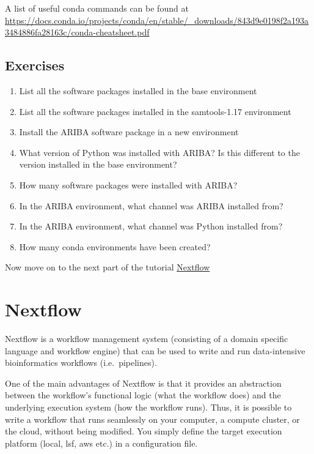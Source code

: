 \documentclass[11pt]{article}
\providecommand{\tightlist}{%
      \setlength{\itemsep}{0pt}\setlength{\parskip}{0pt}}
\begin{document}
A list of useful conda commands can be found at
\url{https://docs.conda.io/projects/conda/en/stable/_downloads/843d9e0198f2a193a3484886fa28163c/conda-cheatsheet.pdf}

    \hypertarget{exercises}{%
\subsection{Exercises}\label{exercises}}

\begin{enumerate}
\def\labelenumi{\arabic{enumi}.}
\tightlist
\item
  List all the software packages installed in the base environment
\item
  List all the software packages installed in the samtools-1.17
  environment
\item
  Install the ARIBA software package in a new environment
\item
  What version of Python was installed with ARIBA? Is this different to
  the version installed in the base environment?
\item
  How many software packages were installed with ARIBA?
\item
  In the ARIBA environment, what channel was ARIBA installed from?
\item
  In the ARIBA environment, what channel was Python installed from?
\item
  How many conda environments have been created?
\end{enumerate}

    Now move on to the next part of the tutorial
\href{nextflow.ipynb}{Nextflow}





\newpage





    \hypertarget{nextflow}{%
\section{Nextflow}\label{nextflow}}

Nextflow is a workflow management system (consisting of a domain
specific language and workflow engine) that can be used to write and run
data-intensive bioinformatics workflows (i.e.~pipelines).

One of the main advantages of Nextflow is that it provides an
abstraction between the workflow's functional logic (what the workflow
does) and the underlying execution system (how the workflow runs). Thus,
it is possible to write a workflow that runs seamlessly on your
computer, a compute cluster, or the cloud, without being modified. You
simply define the target execution platform (local, lsf, aws etc.) in a
configuration file.
\end{document}
